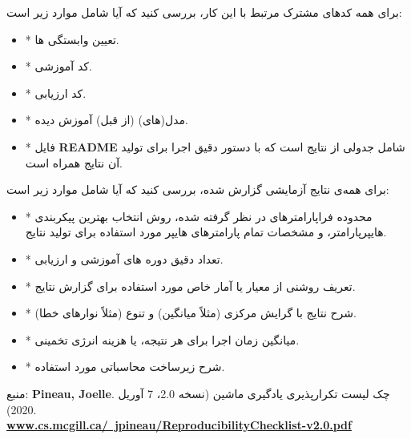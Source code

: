 \begin{tcolorbox}[colback=gray!10,colframe=black,breakable]
    برای همه کدهای مشترک مرتبط با این کار، بررسی کنید که آیا شامل موارد زیر است:
    \begin{itemize}[itemsep=0.2ex]
        \item * تعیین وابستگی ها.
        \item * کد آموزشی.
        \item * کد ارزیابی.
        \item * مدل(های) (از قبل) آموزش دیده.
        \item * فایل \textenglish{\textbf{README}} شامل جدولی از نتایج است که با دستور دقیق اجرا برای تولید آن نتایج همراه است.
        \newline
    \end{itemize}


    برای همه‌ی نتایج آزمایشی گزارش شده، بررسی کنید که آیا شامل موارد زیر است:
    \begin{itemize}[itemsep=0.2ex]
        \item * محدوده فراپارامترهای در نظر گرفته شده، روش انتخاب بهترین پیکربندی هایپرپارامتر، و مشخصات تمام پارامترهای هایپر مورد استفاده برای تولید نتایج.
        \item * تعداد دقیق دوره های آموزشی و ارزیابی.
        \item * تعریف روشنی از معیار یا آمار خاص مورد استفاده برای گزارش نتایج.
        \item * شرح نتایج با گرایش مرکزی (مثلاً میانگین) و تنوع (مثلاً نوارهای خطا).
        \item * میانگین زمان اجرا برای هر نتیجه، یا هزینه انرژی تخمینی.
        \item * شرح زیرساخت محاسباتی مورد استفاده.
        \newline
    \end{itemize}

    منبع: \textenglish{\textbf{Pineau, Joelle}}.
    چک لیست تکرارپذیری یادگیری ماشین (نسخه 2.0، 7 آوریل 2020).
    \\
    \href{https://www.cs.mcgill.ca/~jpineau/ReproducibilityChecklist-v2.0.pdf}{\textenglish{\textbf{www.cs.mcgill.ca/~jpineau/ReproducibilityChecklist-v2.0.pdf}}}
\end{tcolorbox}


